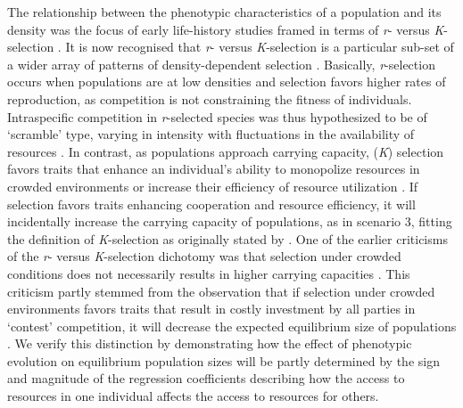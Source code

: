 \documentclass{article}
\begin{document}
	The relationship between the phenotypic characteristics of a population and its density was the focus of early life-history studies framed in terms of \textit{r}- versus \textit{K}-selection \citep{macarthur1967theory}. It is now recognised that \textit{r}- versus \textit{K}-selection is a particular sub-set of a wider array of patterns of density-dependent selection \citep{Boyce1984, Wright2018, Engen2020}. Basically, \textit{r}-selection occurs when populations are at low densities and selection favors higher rates of reproduction, as competition is not constraining the fitness of individuals. Intraspecific competition in \textit{r}-selected species was thus hypothesized to be of `scramble' type, varying in intensity with fluctuations in the availability of resources \citep{Southwood1977}. In contrast, as populations approach carrying capacity, (\textit{K}) selection favors traits that enhance an individual's ability to monopolize resources in crowded environments or increase their efficiency of resource utilization \citep{Boyce1984}. If selection favors traits enhancing cooperation and resource efficiency, it will incidentally increase the carrying capacity of populations, as in scenario 3, fitting the definition of \textit{K}-selection as originally stated by \cite{macarthur1967theory}. One of the earlier criticisms of the \textit{r}- versus \textit{K}-selection dichotomy was that selection under crowded conditions does not necessarily results in higher carrying capacities \citep{Boyce1984}. This criticism partly stemmed from the observation that if selection under crowded environments favors traits that result in costly investment by all parties in `contest' competition, it will decrease the expected equilibrium size of populations \citep{Joshi2001, Engen2020}. We verify this distinction by demonstrating how the effect of phenotypic evolution on equilibrium population sizes will be partly determined by the sign and magnitude of the regression coefficients describing how the access to resources in one individual affects the access to resources for others.
	
\end{document}
